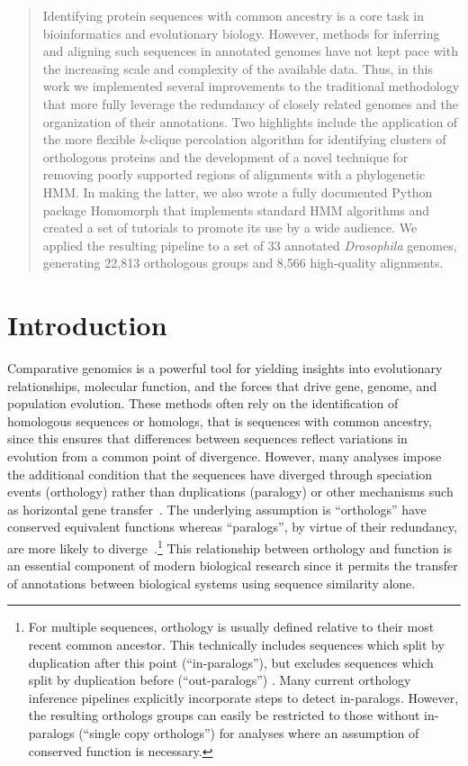 \begin{abstract}
\noindent
Identifying protein sequences with common ancestry is a core task in bioinformatics and evolutionary biology. However, methods for inferring and aligning such sequences in annotated genomes have not kept pace with the increasing scale and complexity of the available data. Thus, in this work we implemented several improvements to the traditional methodology that more fully leverage the redundancy of closely related genomes and the organization of their annotations. Two highlights include the application of the more flexible \textit{k}-clique percolation algorithm for identifying clusters of orthologous proteins and the development of a novel technique for removing poorly supported regions of alignments with a phylogenetic HMM. In making the latter, we also wrote a fully documented Python package Homomorph that implements standard HMM algorithms and created a set of tutorials to promote its use by a wide audience. We applied the resulting pipeline to a set of 33 annotated \textit{Drosophila} genomes, generating 22,813 orthologous groups and 8,566 high-quality alignments.
\end{abstract}

\section*{Introduction}
Comparative genomics is a powerful tool for yielding insights into evolutionary relationships, molecular function, and the forces that drive gene, genome, and population evolution. These methods often rely on the identification of homologous sequences or homologs, that is sequences with common ancestry, since this ensures that differences between sequences reflect variations in evolution from a common point of divergence. However, many analyses impose the additional condition that the sequences have diverged through speciation events (orthology) rather than duplications (paralogy) or other mechanisms such as horizontal gene transfer~\cite{Fitch1970}. The underlying assumption is ``orthologs'' have conserved equivalent functions whereas ``paralogs'', by virtue of their redundancy, are more likely to diverge~\cite{Ohno1970, Nowak1997, Altenhoff2012, Pegueroles2013, Soria2014}.\footnote{For multiple sequences, orthology is usually defined relative to their most recent common ancestor. This technically includes sequences which split by duplication after this point (``in-paralogs''), but excludes sequences which split by duplication before (``out-paralogs'') \cite{Remm2001}. Many current orthology inference pipelines explicitly incorporate steps to detect in-paralogs. However, the resulting orthologs groups can easily be restricted to those without in-paralogs (``single copy orthologs'') for analyses where an assumption of conserved function is necessary.} This relationship between orthology and function is an essential component of modern biological research since it permits the transfer of annotations between biological systems using sequence similarity alone.

